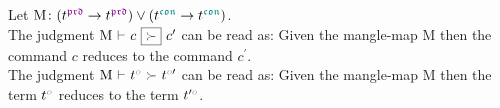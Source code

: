 Let $\text{M} \colon (t^{\polprd} \to t^{\polprd}) \lor (t^{\polcon} \to t^{\polcon})$.
\\
The judgment $\manglecmd{\text{M}}{c}{c^{\prime}}$ can be read as: Given the mangle-map $\text{M}$ then the command $c$ reduces to the command $c^{\prime}$.
\\
The judgment $\mangletm{\text{M}}{t^{\pol}}{t^{\pol\prime}}$ can be read as: Given the mangle-map $\text{M}$ then the term $t^{\pol}$ reduces to the term $t^{\prime\pol}$.

\begin{prooftree}
\end{prooftree}
\vspace*{0.3cm}

\begin{prooftree}
\end{prooftree}
\vspace*{0.3cm}

\begin{prooftree}
\end{prooftree}
\vspace*{0.3cm}

\begin{prooftree}
\end{prooftree}
\vspace*{0.3cm}

\begin{prooftree}
\end{prooftree}
\vspace*{0.3cm}

